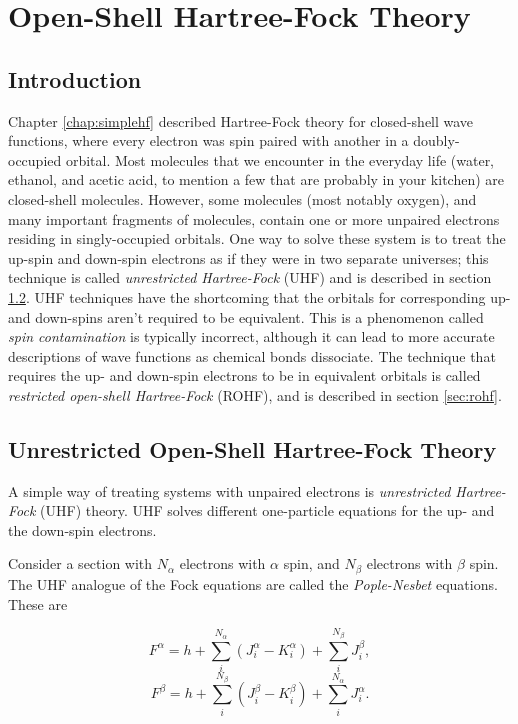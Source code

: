 \chapter{Open-Shell Hartree-Fock Theory}

\section{Introduction}
Chapter \ref{chap:simplehf} described Hartree-Fock theory for
closed-shell wave functions, where every electron was spin paired with
another in a doubly-occupied orbital. Most molecules that we encounter
in the everyday life (water, ethanol, and acetic acid, to mention a
few that are probably in your kitchen) are closed-shell
molecules. However, some molecules (most notably oxygen), and many
important fragments of molecules, contain one or more unpaired
electrons residing in singly-occupied orbitals. One way to solve these
system is to treat the up-spin and down-spin electrons as if they were
in two separate universes; this technique is called \emph{unrestricted
Hartree-Fock} (UHF) and is described in section \ref{sec:uhf}. UHF
techniques have the shortcoming that the orbitals for corresponding
up- and down-spins aren't required to be equivalent. This is a
phenomenon called \emph{spin contamination} is typically incorrect,
although it can lead to more accurate descriptions of wave functions
as chemical bonds dissociate. The technique that requires the up- and
down-spin electrons to be in equivalent orbitals is called
\emph{restricted open-shell Hartree-Fock} (ROHF), and is described in
section
\ref{sec:rohf}. 


\section{Unrestricted Open-Shell Hartree-Fock Theory}
\label{sec:uhf}
A simple way of treating systems with unpaired electrons is
\emph{unrestricted Hartree-Fock} (UHF) theory. UHF solves different
one-particle equations for the up- and the down-spin electrons. 

Consider a section with $N_\alpha$ electrons with $\alpha$ spin, and
$N_\beta$ electrons with $\beta$ spin. The UHF analogue of the Fock
equations are called the \emph{Pople-Nesbet} equations. These are

\begin{equation}
F^\alpha = h + \sum_i^{N_\alpha} \left(J_i^\alpha-K_i^\alpha\right)
             + \sum_i^{N_\beta} J_i^\beta,
\label{eq:pnalpha}
\end{equation}
\begin{equation}
F^\beta = h + \sum_i^{N_\beta} \left(J_i^\beta-K_i^\beta\right)
             + \sum_i^{N_\alpha} J_i^\alpha.
\label{eq:pnbeta}
\end{equation}

